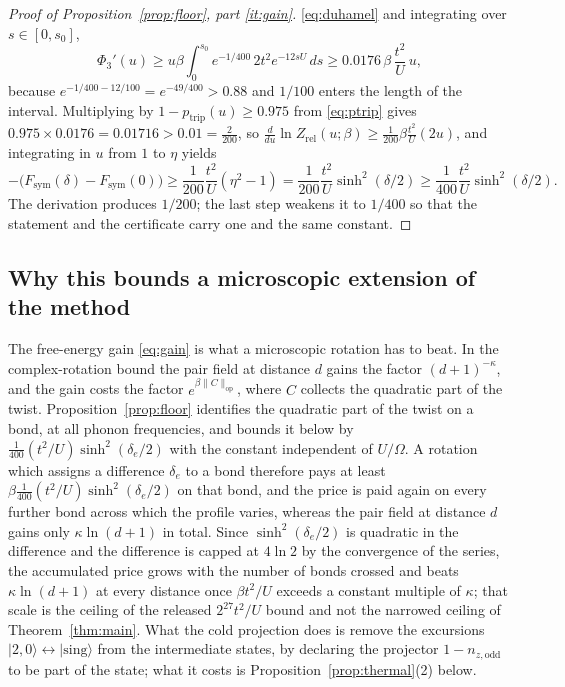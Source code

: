 \documentclass[11pt]{article}
\theoremstyle{plain}
\theoremstyle{definition}
\begin{document}
\begin{proof}[Proof of Proposition~\ref{prop:floor}, part \ref{it:gain}]
\eqref{eq:duhamel} and integrating over $s\in[0,s_0]$,
\begin{equation}\label{eq:phiprime}
\Phi_3'(u)\ge u\beta\int_0^{s_0}e^{-1/400}\,2t^{2}e^{-12sU}\,ds\ge0.0176\,\beta\,\frac{t^{2}}{U}\,u ,
\end{equation}
because $e^{-1/400-12/100}=e^{-49/400}>0.88$ and $1/100$ enters the length of the
interval. Multiplying by $1-p_{\mathrm{trip}}(u)\ge0.975$ from \eqref{eq:ptrip}
gives $0.975\times0.0176=0.01716>0.01=\frac{2}{200}$, so
$\frac{d}{du}\ln Z_{\mathrm{rel}}(u;\beta)\ge\frac{1}{200}\beta\frac{t^{2}}{U}(2u)$,
and integrating in $u$ from $1$ to $\eta$ yields
\begin{equation}\label{eq:finalgain}
-\bigl(F_{\mathrm{sym}}(\delta)-F_{\mathrm{sym}}(0)\bigr)
\ge\frac{1}{200}\frac{t^{2}}{U}(\eta^{2}-1)=\frac{1}{200}\frac{t^{2}}{U}\sinh^{2}(\delta/2)\ge\frac{1}{400}\frac{t^{2}}{U}\sinh^{2}(\delta/2).
\end{equation}
The derivation produces $1/200$; the last step weakens it to $1/400$ so that the
statement and the certificate carry one and the same constant.
\end{proof}

\subsection{Why this bounds a microscopic extension of the method}

The free-energy gain \eqref{eq:gain} is what a microscopic rotation has to beat.
In the complex-rotation bound the pair field at distance $d$ gains the factor
$(d+1)^{-\kappa}$, and the gain costs the factor $e^{\beta\|C\|_{\mathrm{op}}}$,
where $C$ collects the quadratic part of the twist. Proposition~\ref{prop:floor}
identifies the quadratic part of the twist on a bond, at all phonon frequencies,
and bounds it below by $\frac{1}{400}(t^{2}/U)\sinh^{2}(\delta_e/2)$ with the
constant independent of $U/\Omega$. A rotation which assigns a difference
$\delta_e$ to a bond therefore pays at least
$\beta\frac{1}{400}(t^{2}/U)\sinh^{2}(\delta_e/2)$ on that bond, and the price is
paid again on every further bond across which the profile varies, whereas the pair
field at distance $d$ gains only $\kappa\ln(d+1)$ in total. Since
$\sinh^{2}(\delta_e/2)$ is quadratic in the difference and the difference is
capped at $4\ln2$ by the convergence of the series, the accumulated price grows
with the number of bonds crossed and beats $\kappa\ln(d+1)$ at every distance once
$\beta t^{2}/U$ exceeds a constant multiple of $\kappa$; that scale is the ceiling
of the released $2^{27}t^{2}/U$ bound and not the narrowed ceiling of
Theorem~\ref{thm:main}. What the cold projection does is remove the excursions
$|2,0\rangle\leftrightarrow|\mathrm{sing}\rangle$ from the intermediate states, by
declaring the projector $1-n_{z,\mathrm{odd}}$ to be part of the state; what it
costs is Proposition~\ref{prop:thermal}(2) below.
\end{document}
